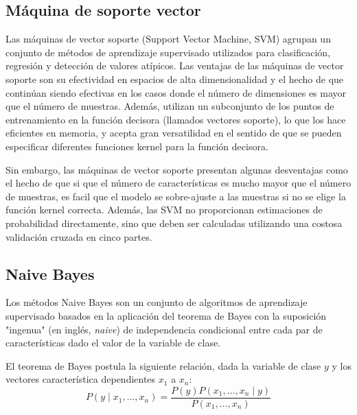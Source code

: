 \subsection{Máquina de soporte vector}


Las máquinas de vector soporte (Support Vector Machine, SVM) agrupan un conjunto de métodos de aprendizaje supervisado utilizados para clasificación, regresión y detección de valores atípicos. Las ventajas de las máquinas de vector soporte son su efectividad en espacios de alta dimensionalidad y el hecho de que continúan siendo efectivas en los casos donde el número de dimensiones es mayor que el número de muestras.
Además, utilizan un subconjunto de los puntos de entrenamiento en la función decisora (llamados vectores soporte), lo que los hace eficientes en memoria, y acepta gran versatilidad en el sentido de que se pueden especificar diferentes funciones kernel para la función decisora.

Sin embargo, las máquinas de vector soporte presentan algunas desventajas como el hecho de que si que el número de características es mucho mayor que el número de muestras, es facil que el modelo se sobre-ajuste a las muestras si no se elige la función kernel correcta. 
Además, las SVM no proporcionan estimaciones de probabilidad directamente, sino que deben ser calculadas utilizando una costosa validación cruzada en cinco partes.

\subsection{Naive Bayes}


Los métodos Naive Bayes son un conjunto de algoritmos de aprendizaje supervisado basados en la aplicación del teorema de Bayes con la suposición "ingenua" (en inglés, \emph{naive}) de independencia condicional entre cada par de características dado el valor de la variable de clase. 

El teorema de Bayes postula la siguiente relación, dada la variable de clase $y$ y los vectores característica dependientes $x_{1}$ a $x_{n}$:
\begin{equation*}
    P(y \mid x_{1},\dots,x_{n}) = \dfrac{P(y)P(x_{1},\dots,x_{n}\mid y)}{P(x_{1},\dots,x_{n})}
\end{equation*}

